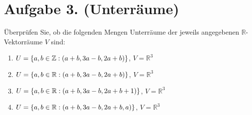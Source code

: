 \documentclass[german,12pt]{homework}
\DeclarePairedDelimiter{\enbrace}{(}{)}
\DeclarePairedDelimiter{\penbrace}{\{}{\}}
\begin{document}
    \section*{Aufgabe 3. (Unterräume)}

    \begin{problem}
        Überprüfen Sie, ob die folgenden Mengen Unterräume der jeweils angegebenen \(\mathbb{R}\)-Vektorräume \(V\) sind:
        \begin{enumerate}
            \item \(U = \penbrace*{a, b \in \mathbb{Z}: \enbrace*{a + b, 3a - b, 2a + b}}\), \quad \(V = \mathbb{R}^3\)
            \item \(U = \penbrace*{a, b \in \mathbb{R}: \enbrace*{a + b, 3a - b, 2a + b}}\), \quad \(V = \mathbb{R}^3\)
            \item \(U = \penbrace*{a, b \in \mathbb{R}: \enbrace*{a + b, 3a - b, 2a + b + 1}}\), \quad \(V = \mathbb{R}^3\)
            \item \(U = \penbrace*{a, b \in \mathbb{R}: \enbrace*{a + b, 3a - b, 2a + b, a}}\), \quad \(V = \mathbb{R}^3\)
        \end{enumerate}
    \end{problem}
\end{document}
